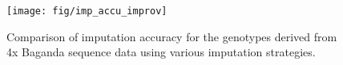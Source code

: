 \begin{figure}[htp]
\centering
\texttt{[image: fig/imp\_accu\_improv]}
\caption{Comparison of imputation accuracy for the genotypes derived from 4x Baganda sequence data using various imputation strategies.}
\label{fig:imp_accu_improv}
\end{figure}